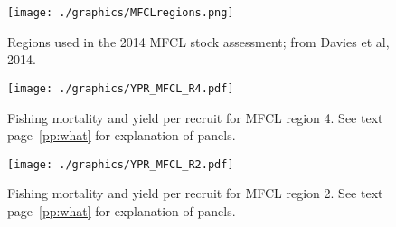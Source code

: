 \documentclass[12pt,letterpaper]{article}
\begin{document}
\begin{figure}
\begin{center}
\texttt{[image: ./graphics/MFCLregions.png]}
\caption{\label{fig:mfclreg}
Regions used in the 2014 MFCL stock assessment; from Davies et al,
2014.
}
\end{center}
\end{figure}

\begin{figure}
\begin{center}
\texttt{[image: ./graphics/YPR\_MFCL\_R4.pdf]}
\caption{\label{fig:r4ypr}
Fishing mortality and yield per recruit for MFCL region 4.
See text page~\ref{pp:what} for explanation of panels.
}
\end{center}
\end{figure}

\begin{figure}
\begin{center}
\texttt{[image: ./graphics/YPR\_MFCL\_R2.pdf]}
\caption{\label{fig:r2ypr}
Fishing mortality and yield per recruit for MFCL region 2.
See text page~\ref{pp:what} for explanation of panels.
}
\end{center}
\end{figure}
\end{document}
